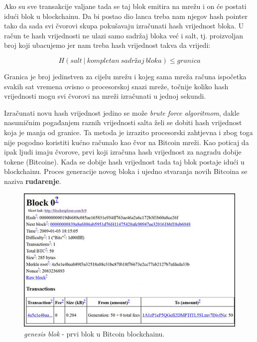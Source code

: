 \documentclass[a4paper,oneside,12pt]{memoir} %
\begin{document}
Ako su sve transakcije valjane tada se taj blok emitira na mrežu i on će postati idući blok u blockchainu. Da bi postao dio lanca treba nam njegov hash pointer tako da sada svi čvorovi skupa pokušavaju izračunati hash vrijednost bloka. U račun te hash vrijednosti ne ulazi samo sadržaj bloka već i salt, tj. proizvoljan broj koji ubacujemo jer nam treba hash vrijednost takva da vrijedi:

\begin{equation}
\label{eq:hash}
    H(salt\ |\ kompletan\ sadržaj\ bloka) \leq granica
\end{equation}

\begin{definicija}
Granica je broj jedinstven za cijelu mrežu i kojeg sama mreža računa ispočetka svakih sat vremena ovisno o procesorskoj snazi mreže, točnije koliko hash vrijednosti mogu svi čvorovi na mreži izračunati u jednoj sekundi.
\end{definicija}


Izračunati novu hash vrijednost jedino se može \textit{brute force algoritmom}, dakle nasumičnim pogađanjem raznih vrijednosti salta želi se dobiti hash vrijednost koja je manja od granice. Ta metoda je izrazito procesorski zahtjevna i zbog toga nije  pogodno koristiti kućno računalo kao čvor na Bitcoin mreži. Kao poticaj da ipak ljudi imaju čvorove, prvi koji izračuna hash vrijednost za nagradu dobije  tokene (Bitcoine). Kada se dobije hash vrijednost tada taj blok postaje idući u blockchainu. Proces generacije novog bloka i ujedno stvaranja novih Bitcoina se naziva \textbf{rudarenje}.

\begin{figure}[H]
\centering
\includegraphics[scale=0.5]{genisis_block}
\caption{ \textit{genesis blok} - prvi blok u Bitcoin blockchainu.}
\end{figure}
\end{document}
